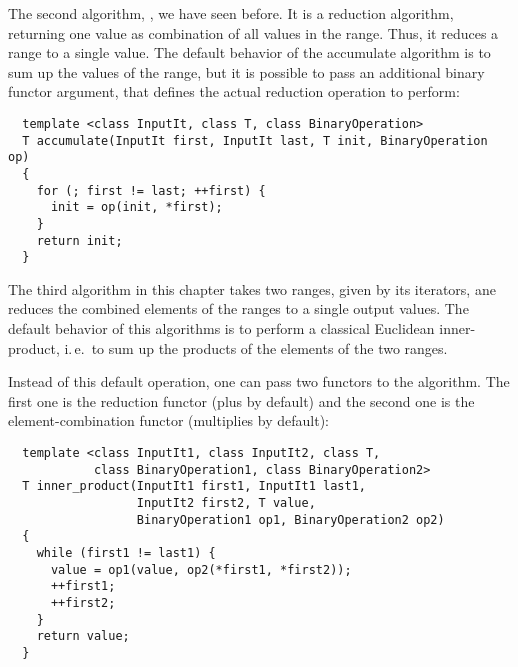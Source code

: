 The second algorithm, , we have seen before. It is a reduction algorithm, returning one value as combination of all values in the range.
Thus, it reduces a range to a single value. The default behavior of the accumulate algorithm is to sum up the values of the range, but it is possible to
pass an additional binary functor argument, that defines the actual reduction operation to perform:
%
\begin{samepage}
\begin{verbatim}
  template <class InputIt, class T, class BinaryOperation>
  T accumulate(InputIt first, InputIt last, T init, BinaryOperation op)
  {
    for (; first != last; ++first) {
      init = op(init, *first);
    }
    return init;
  }
\end{verbatim}
\end{samepage}

The third algorithm in this chapter takes two ranges, given by its iterators, ane reduces the combined elements of the ranges to a single output values.
The default behavior of this algorithms is to perform a classical Euclidean inner-product, i.\,e.\ to sum up the products of the elements of the two ranges.

Instead of this default operation, one can pass two functors to the algorithm. The first one is the reduction functor (plus by default) and the second one
is the element-combination functor (multiplies by default):
%
\begin{samepage}
\begin{verbatim}
  template <class InputIt1, class InputIt2, class T,
            class BinaryOperation1, class BinaryOperation2>
  T inner_product(InputIt1 first1, InputIt1 last1,
                  InputIt2 first2, T value,
                  BinaryOperation1 op1, BinaryOperation2 op2)
  {
    while (first1 != last1) {
      value = op1(value, op2(*first1, *first2));
      ++first1;
      ++first2;
    }
    return value;
  }
\end{verbatim}
\end{samepage}

